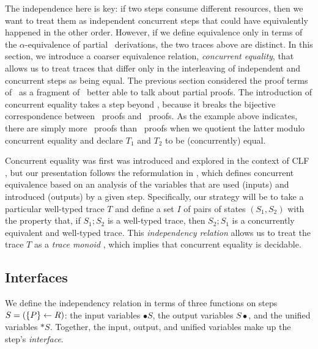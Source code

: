 The independence here is key: if two steps consume different
resources, then we want to treat them as independent concurrent steps
that could have equivalently happened in the other order. However, if
we define equivalence only in terms of the $\alpha$-equivalence of
partial \ollll~derivations, the two traces above are distinct. In this
section, we introduce a coarser equivalence relation, {\it concurrent
  equality}, that allows us to treat traces that differ only in the
interleaving of independent and concurrent steps as being equal.  The
previous section considered the proof terms of \sls~as a fragment of
\ollll~better able to talk about partial proofs.  The introduction of
concurrent equality takes a step beyond \ollll, because it breaks the
bijective correspondence between \ollll~proofs and \sls~proofs. As the
example above indicates, there are simply more \ollll~proofs than
\sls~proofs when we quotient the latter modulo concurrent equality and
declare $T_1$ and $T_2$ to be (concurrently) equal.

Concurrent equality was first was introduced and explored in the
context of CLF \cite{watkins02concurrent}, but our presentation
follows the reformulation in \cite{cervesato12trace}, which defines
concurrent equivalence based on an analysis of the variables that are
used (inputs) and introduced (outputs) by a given step.  Specifically,
our strategy will be to take a particular well-typed trace $T$ and
define a set $I$ of pairs of states $(S_1, S_2)$ with the property
that, if $S_1; S_2$ is a well-typed trace, then $S_2; S_1$ is a
concurrently equivalent and well-typed trace.  This {\it independency
  relation} allows us to treat the trace $T$ as a {\it trace monoid}
\cite{diekert90combinatorics}, which implies that concurrent equality
is decidable.

\subsection{Interfaces}


We define the independency relation in terms of three functions on
steps $S = (\{{P}\} \leftarrow {R})$: the input variables ${\bullet}S$,
the output variables $S{\bullet}$, and the unified variables
${\ast}S$. Together, the input, output, and unified variables make
up the step's {\it interface}. 

